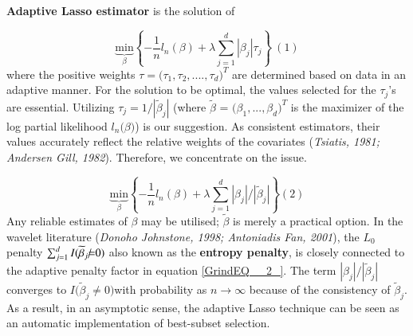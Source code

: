 \documentclass{article} %
\begin{document}
\noindent \textbf{}

\noindent \textbf{}

\noindent \textbf{}

\noindent \textbf{}

\noindent \textbf{}

\noindent \textbf{}

\noindent \textbf{}

\noindent \textbf{Adaptive Lasso estimator}  is the solution of


\[\underbrace{\mathrm{min}}_{\beta }\left\{-\frac{\mathrm{1}}{n}l_n\left(\beta \right)+\lambda \sum^d_{j\mathrm{=1}}{}\left|{\beta }_j\right|{\tau }_j\right\}\mathrm{\ }\mathrm{(1)}\] 
where the positive weights $\tau \mathrm{=(}{\tau }_{\mathrm{1}},{\tau }_{\mathrm{2}},....,{\tau }_d{\mathrm{)}}^T$ are determined based on data in an adaptive manner. For the solution to be optimal, the values selected for the ${\tau }_j$'s are essential. Utilizing ${\tau }_j\mathrm{=1/}\left|{\widetilde{\beta }}_j\right|$ (where $\widetilde{\beta }$ = $\mathrm{(}{\beta }_{\mathrm{1}},...,{\beta }_d{\mathrm{)}}^T$ is the maximizer of the log partial likelihood $l_n\mathrm{(}\beta \mathrm{)}$) is our suggestion. As consistent estimators, their values accurately reflect the relative weights of the covariates (\textit{Tsiatis, 1981; Andersen   Gill, 1982}). Therefore, we concentrate on the issue. 

\noindent 
\[\underbrace{\mathrm{min}}_{\beta }\left\{-\frac{\mathrm{1}}{n}l_n\left(\beta \right)+\lambda \sum^d_{j\mathrm{=1}}{}\left|{\beta }_j\right|\mathrm{/}\left|{\widetilde{\beta }}_j\right|\right\}\mathrm{(2)}\] 
Any reliable estimates of $\beta $ may be utilised; $\widetilde{\beta }$ is merely a practical option. In the wavelet literature (\textit{Donoho Johnstone, 1998; Antoniadis Fan, 2001}), the $L_0$ penalty $\sum^d_{j\mathrm{=1}}{}I\mathrm{(}{\widetilde{\beta }}_j\rlap{/}\mathrm{=}\mathrm{0)}$ also known as the \textbf{entropy penalty}, is closely connected to the adaptive penalty factor in equation \eqref{GrindEQ__2_}. The term $\left|{\beta }_j\right|\mathrm{/}\left|{\widetilde{\beta }}_j\right|$ converges to $I\mathrm{(}{\widetilde{\beta }}_j\mathrm{\neq }\mathrm{0)}$with probability as $n\to \infty $ because of the consistency of ${\widetilde{\beta }}_j$. As a result, in an asymptotic sense, the adaptive Lasso technique can be seen as an automatic implementation of best-subset selection.
\end{document}
